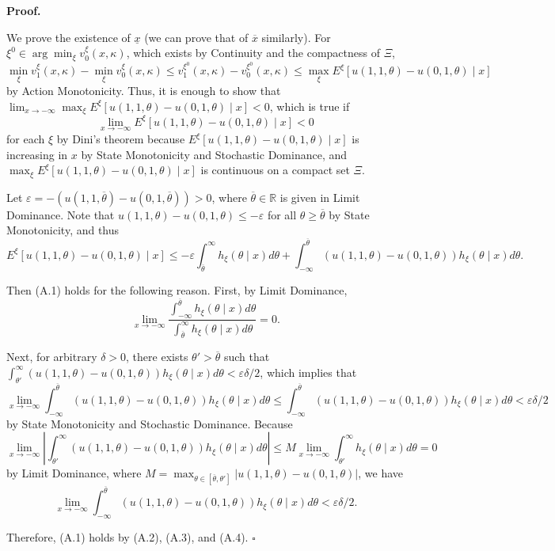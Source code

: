 \documentclass[12pt,a4paper]{article}
\newenvironment{original}
  {\par\medskip\noindent\color{black}\ignorespaces}
  {\par\medskip}
\theoremstyle{definition}
\theoremstyle{remark}
\begin{document}
\medskip
\noindent\textbf{Proof.}
\begin{original}
We prove the existence of $\underline{x}$ (we can prove that of $\overline{x}$ similarly). For $\xi^0 \in \arg\min_{\xi} v_0^\xi(x, \kappa)$, which exists by Continuity and the compactness of $\Xi$,
\[
\min_{\xi} v_1^\xi(x, \kappa) - \min_{\xi} v_0^\xi(x, \kappa) \le v_1^{\xi^0}(x, \kappa) - v_0^{\xi^0}(x, \kappa) \le \max_{\xi} E^\xi[u(1, 1, \theta) - u(0, 1, \theta) \mid x]
\]
by Action Monotonicity. Thus, it is enough to show that $\lim_{x \to -\infty} \max_{\xi} E^\xi[u(1, 1, \theta) - u(0, 1, \theta) \mid x] < 0$, which is true if
\[
\lim_{x \to -\infty} E^\xi[u(1, 1, \theta) - u(0, 1, \theta) \mid x] < 0
\tag{A.1}
\]
for each $\xi$ by Dini's theorem because $E^\xi[u(1, 1, \theta) - u(0, 1, \theta) \mid x]$ is increasing in $x$ by State Monotonicity and Stochastic Dominance, and $\max_{\xi} E^\xi[u(1, 1, \theta) - u(0, 1, \theta) \mid x]$ is continuous on a compact set $\Xi$.

Let $\varepsilon = -(u(1, 1, \overline{\theta}) - u(0, 1, \overline{\theta})) > 0$, where $\overline{\theta} \in \mathbb{R}$ is given in Limit Dominance. Note that $u(1, 1, \theta) - u(0, 1, \theta) \le -\varepsilon$ for all $\theta \ge \overline{\theta}$ by State Monotonicity, and thus
\[
E^\xi[u(1, 1, \theta) - u(0, 1, \theta) \mid x] \le -\varepsilon \int_{\overline{\theta}}^{\infty} h_\xi(\theta \mid x) d\theta + \int_{-\infty}^{\overline{\theta}} (u(1, 1, \theta) - u(0, 1, \theta)) h_\xi(\theta \mid x) d\theta.
\tag{A.2}
\]

Then (A.1) holds for the following reason. First, by Limit Dominance,
\[
\lim_{x \to -\infty} \frac{\int_{-\infty}^{\overline{\theta}} h_\xi(\theta \mid x) d\theta}{\int_{\overline{\theta}}^{\infty} h_\xi(\theta \mid x) d\theta} = 0.
\tag{A.3}
\]

Next, for arbitrary $\delta > 0$, there exists $\theta' > \overline{\theta}$ such that $\int_{\theta'}^{\infty} (u(1, 1, \theta) - u(0, 1, \theta)) h_\xi(\theta \mid x) d\theta < \varepsilon\delta/2$, which implies that
\[
\lim_{x \to -\infty} \int_{-\infty}^{\overline{\theta}} (u(1, 1, \theta) - u(0, 1, \theta)) h_\xi(\theta \mid x) d\theta \le \int_{-\infty}^{\overline{\theta}} (u(1, 1, \theta) - u(0, 1, \theta)) h_\xi(\theta \mid x) d\theta < \varepsilon\delta/2
\]
by State Monotonicity and Stochastic Dominance. Because
\[
\lim_{x \to -\infty} \left| \int_{\theta'}^{\infty} (u(1, 1, \theta) - u(0, 1, \theta)) h_\xi(\theta \mid x) d\theta \right| \le M \lim_{x \to -\infty} \int_{\theta'}^{\infty} h_\xi(\theta \mid x) d\theta = 0
\]
by Limit Dominance, where $M = \max_{\theta \in [\overline{\theta}, \theta']} |u(1, 1, \theta) - u(0, 1, \theta)|$, we have
\[
\lim_{x \to -\infty} \int_{-\infty}^{\overline{\theta}} (u(1, 1, \theta) - u(0, 1, \theta)) h_\xi(\theta \mid x) d\theta < \varepsilon\delta/2.
\tag{A.4}
\]

Therefore, (A.1) holds by (A.2), (A.3), and (A.4). $\square$
\end{original}
\end{document}

